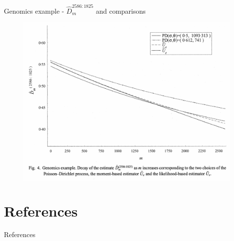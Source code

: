 \documentclass[11pt]{beamer}
\begin{document}
\begin{frame}{Genomics example - \(\hat{D}_m^{2586:1825}\) and comparisons}
    \begin{figure}
        \includegraphics[scale=0.35]{./img/lijoi07_genomics_plot.png}
        \label{fig:genomics_2}
    \end{figure}
\end{frame}


\section{References}
\begin{frame}{References}
    \scriptsize{}
    
\end{frame}
 
\end{document}
